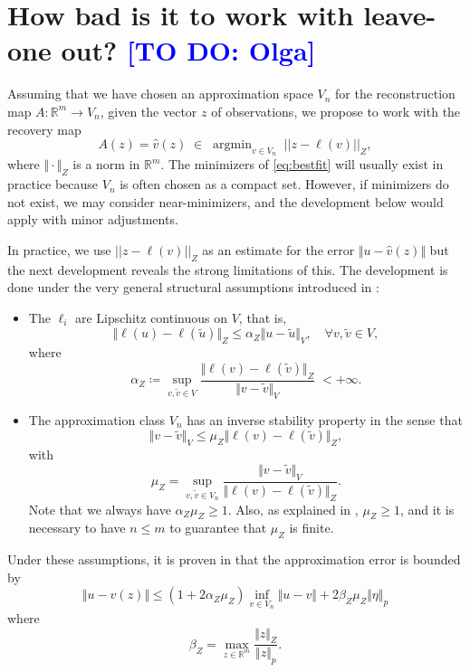 \documentclass[11pt,a4paper,twoside]{article}
\theoremstyle{definition}
\numberwithin{equation}{section}
\newcommand{\bR}{\ensuremath{\mathbb{R}}}
\newcommand{\<}{\langle}
\renewcommand{\>}{\rangle}
\newcommand{\argmin}{\operatorname{argmin}}
\newcommand{\om}[1]{\textcolor{blue}{#1}}
\begin{document}
\appendix
\section{How bad is it to work with leave-one out? \om{[TO DO: Olga]}}
Assuming that we have chosen an approximation space $V_n$ for the reconstruction map $A:\bR^m \to V_n$, given the vector $z$ of observations, we propose to work with the recovery map
\begin{equation}
\label{eq:bestfit}
A(z) = \hat v(z) \;\in\; \argmin_{v \in V_n} \; || z - \ell(v) ||_Z ,
\end{equation}
where $\Vert \cdot \Vert_Z$ is a norm in $\bR^m$. The minimizers of \eqref{eq:bestfit} will usually exist in practice because $V_n$ is often chosen as a compact set. However, if minimizers do not exist, we may consider near-minimizers, and the development below would apply with minor adjustments.

In practice, we use $|| z - \ell(v) ||_Z$ as an estimate for the error $\Vert u - \hat v(z) \Vert$ but the next development reveals the strong limitations of this. The development is done under the very general structural assumptions introduced in \cite{CDMS2023}:

\begin{itemize}
\item The $\ell_i$ are Lipschitz continuous on $V$, that is,
\begin{equation}
\label{eq:struct1}
\Vert \ell(u) - \ell(\tilde u) \Vert_Z \leq \alpha_Z \Vert u - \tilde u \Vert_V, \quad \forall v, \tilde v \in V,
\end{equation}
where
$$
\alpha_Z \coloneqq \sup_{v, \tilde v \in V}
\frac{ \Vert \ell(v) - \ell(\tilde v) \Vert_Z }{ \Vert v - \tilde v \Vert_V} \; <+\infty .
$$
\item The approximation class $V_n$ has an inverse stability property in the sense that
\begin{equation}
      \label{eq:struct2}
\Vert v - \tilde v \Vert_V
\leq
\mu_Z \Vert \ell(v) - \ell(\tilde v) \Vert_Z,
\end{equation}
with
$$
\mu_Z = \sup_{v, \tilde v \in V_n}
\frac{ \Vert v - \tilde v \Vert_V }{ \Vert \ell(v) - \ell(\tilde v) \Vert_Z}.
$$
Note that we always have $\alpha_Z\mu_Z \geq 1$. Also, as explained in \cite{CDMS2023}, $\mu_Z\geq 1$, and it is necessary to have $n\leq m$ to guarantee that $\mu_Z$ is finite.
\end{itemize}
Under these assumptions, it is proven in \cite{} that the approximation error is
bounded by
$$
\Vert u - \hat v(z) \Vert \leq (1+2\alpha_Z \mu_Z) \inf_{v\in V_n} \Vert u - v \Vert + 2 \beta_Z \mu_Z \Vert \eta \Vert_p
$$
where
$$
\beta_Z = \max_{z\in \bR^m} \frac{\Vert z \Vert_Z}{\Vert z \Vert_p}.
$$
\end{document}

